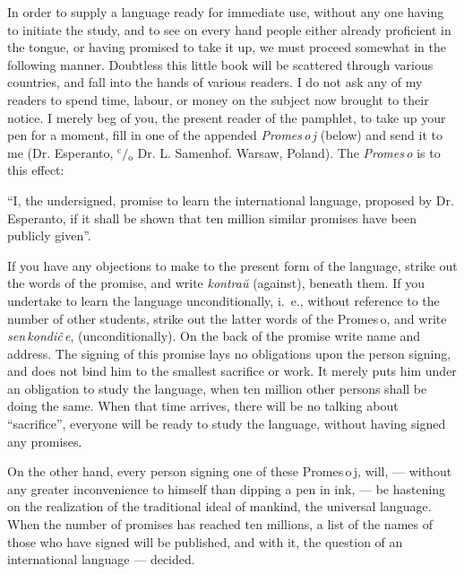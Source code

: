 \documentclass[12pt,twoside]{book}
\begin{document}
In order to supply a language ready for immediate use, without any one having to initiate the study, and to see on every hand people either already proficient in the tongue, or having promised to take it up, we must proceed somewhat in the following manner. Doubtless this little book will be scattered through various countries, and fall into the hands of various readers. I do not ask any of my readers to spend time, labour, or money on the subject now brought to their notice. I merely beg of you, the present reader of the pamphlet, to take up your pen for a moment, fill in one of the appended \emph{\glqq Promes\,o\,j\grqq} (below) and send it to me (Dr. Esperanto, $\mathrm{^c\!/\!_o}$ Dr. L. Samenhof. Warsaw, Poland). The \emph{\glqq Promes\,o\grqq} is to this effect:

\begin{adjustwidth}{1cm}{1cm}
\hspace{1.5em} “I, the undersigned, promise to learn the international language, proposed by Dr. Es\-per\-anto, if it shall be shown that ten million similar promises have been publicly given”.
\end{adjustwidth}

If you have any objections to make to the present form of the language, strike out the words of the promise, and write \emph{\glqq kontraŭ\grqq} (against), beneath them. If you undertake to learn the language unconditionally, i.~e., without reference to the number of other students, strike out the latter words of the \glqq Promes\,o\grqq, and write \emph{\glqq{}sen\,kondiĉ\,e\grqq{}}, (unconditionally). On the back of the promise write name and address. The signing of this promise lays no obligations upon the person signing, and does not bind him to the smallest sacrifice or work. It merely puts him under an obligation to study the language, when ten million other persons shall be doing the same. When that time arrives, there will be no talking about ``sacrifice'', everyone will be ready to study the language, without having signed any promises.

On the other hand, every person signing one of these \glqq{}Promes\,o\,j\grqq{}, will, --- without any greater inconvenience to himself than dipping a pen in ink, --- be hastening on the realization of the traditional ideal of mankind, the universal language. When the number of promises has reached ten millions, a list of the names of those who have signed will be published, and with it, the question of an international language --- decided.
\end{document}
